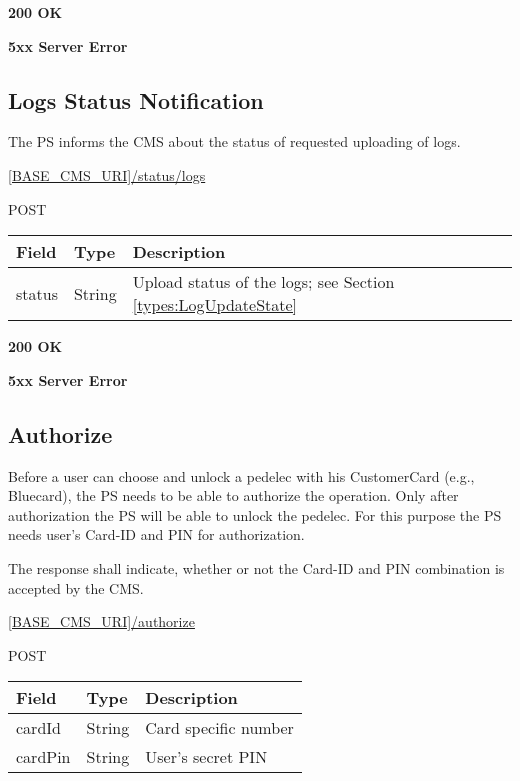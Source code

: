  \textbf{200 OK}

 \textbf{5xx Server Error}

\subsection{Logs Status Notification}

The \acs{PS} informs the \acs{CMS} about the status of requested uploading of logs.

 \url{[BASE_CMS_URI]/status/logs}

 POST

\begin{tabularx}{\linewidth}{ | l | l | X | }
  \hline
  \rowcolor{table-head}
  Field & Type & Description \\
  \hline
  	status & String			& Upload status of the logs; see Section \ref{types:LogUpdateState} \\	
  \hline
\end{tabularx}

 \textbf{200 OK}

 \textbf{5xx Server Error}

\subsection{Authorize}

Before a user can choose and unlock a pedelec with his CustomerCard (e.g., Bluecard), the \acs{PS} needs to be able to authorize the operation. Only after authorization the \acs{PS} will be able to unlock the pedelec. For this purpose the \acs{PS} needs user's Card-ID and PIN for authorization.

The response shall indicate, whether or not the Card-ID and PIN combination is accepted by the \acs{CMS}.

 \url{[BASE_CMS_URI]/authorize}

 POST

\begin{table}[!h]
\vspace{-7mm}
\begin{tabularx}{\linewidth}{ | l | l |  X | }
  \hline
  \rowcolor{table-head}
  Field & Type & Description \\
  \hline
  	cardId & String 		& Card specific number\\
  	cardPin & String			& User's secret PIN \\
    \hline
\end{tabularx}
\end{table}

